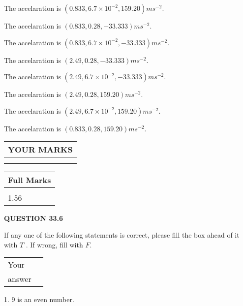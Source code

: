 \documentclass[12pt]{article}
\begin{document}
  
 
 
The accelaration is $  %
(
0.833,
6.7 \times 10^{-2},
159.20)
ms^{-2} $.
 
 
The accelaration is $  %
(
0.833,
0.28,
-33.333)
ms^{-2} $.
 
 
The accelaration is $  %
(
0.833,
6.7 \times 10^{-2},
-33.333)
ms^{-2} $.
 
 
The accelaration is $  %
(
2.49,
0.28,
-33.333)
ms^{-2} $.
 
 
The accelaration is $  %
(
2.49,
6.7 \times 10^{-2},
-33.333)
ms^{-2} $.
 
 
The accelaration is $  %
(
2.49,
0.28,
159.20)
ms^{-2} $.
 
 
The accelaration is $  %
(
2.49,
6.7 \times 10^{-2},
159.20)
ms^{-2} $.
 
 
The accelaration is $  %
(
0.833,
0.28,
159.20)
ms^{-2} $.
 
 
 

 

 
\vspace{0.3in}
  
\vspace{0.2in}
  
\noindent\begin{tabular}{|l|}
\hline
 YOUR MARKS  \\
\hline
 \\ 
 \\ 
\hline
\end{tabular}
\hspace{0.05in} \begin{tabular}{|l|}
\hline
 Full Marks  \\
\hline
 \\ 
1.56 \\
\hline
\end{tabular}
{\textbf{\Large{QUESTION
33.6 
}}}
  
  
If any one of the following statements is correct, please fill the box ahead of it with $T$ .
If wrong, fill with $F$.
 
\noindent\begin{tabular}{|l|l|}\hline Your&\hspace{.2in} \\ answer&\hspace{.2in} \\ \hline \end{tabular}
1. $ %
9$ is an  %
even number.
 
\end{document}
